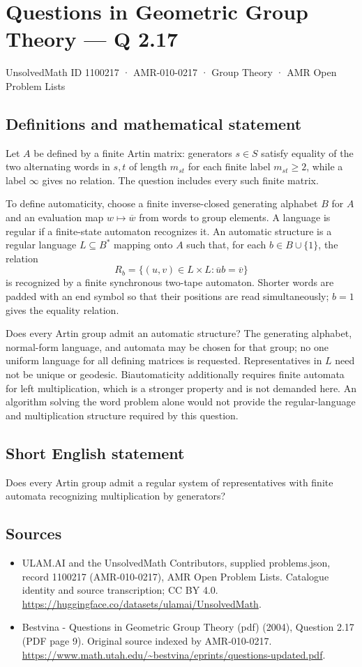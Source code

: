 \documentclass[11pt,a4paper]{article}
\begin{document}
\section*{Questions in Geometric Group Theory — Q 2.17}\label{1100217}
{\small UnsolvedMath ID 1100217 · AMR-010-0217 · Group Theory · AMR Open Problem Lists}
\subsection{Definitions and mathematical statement}
Let $A$ be defined by a finite Artin matrix: generators $s\in S$ satisfy equality of the two alternating words in $s,t$ of length $m_{st}$ for each finite label $m_{st}\geq2$, while a label $\infty$ gives no relation. The question includes every such finite matrix.

To define automaticity, choose a finite inverse-closed generating alphabet $B$ for $A$ and an evaluation map $w\mapsto\overline w$ from words to group elements. A language is regular if a finite-state automaton recognizes it. An automatic structure is a regular language $L\subseteq B^*$ mapping onto $A$ such that, for each $b\in B\cup\{1\}$, the relation
\[
 R_b=\{(u,v)\in L\times L:\overline u b=\overline v\}
\]
is recognized by a finite synchronous two-tape automaton. Shorter words are padded with an end symbol so that their positions are read simultaneously; $b=1$ gives the equality relation.

Does every Artin group admit an automatic structure? The generating alphabet, normal-form language, and automata may be chosen for that group; no one uniform language for all defining matrices is requested. Representatives in $L$ need not be unique or geodesic. Biautomaticity additionally requires finite automata for left multiplication, which is a stronger property and is not demanded here. An algorithm solving the word problem alone would not provide the regular-language and multiplication structure required by this question.
\subsection{Short English statement}
Does every Artin group admit a regular system of representatives with finite automata recognizing multiplication by generators?
\subsection{Sources}
\begin{itemize}
\item[S1] ULAM.AI and the UnsolvedMath Contributors, supplied problems.json, record 1100217 (AMR-010-0217), AMR Open Problem Lists. Catalogue identity and source transcription; CC BY 4.0.
\url{https://huggingface.co/datasets/ulamai/UnsolvedMath}.
\item[S2] Bestvina - Questions in Geometric Group Theory (pdf) (2004), Question 2.17 (PDF page 9). Original source indexed by AMR-010-0217.
\url{https://www.math.utah.edu/~bestvina/eprints/questions-updated.pdf}.
\end{itemize}
\end{document}
